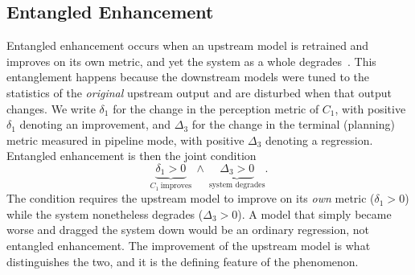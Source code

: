 \documentclass[conference]{IEEEtran}
\begin{document}
\subsection{Entangled Enhancement}
\label{sec:ee-def}
Entangled enhancement occurs when an upstream model is retrained and improves on
its own metric, and yet the system as a whole degrades~\cite{wang2024compsac}.
This entanglement happens because the downstream models were tuned to the
statistics of the \emph{original} upstream output and are disturbed when that
output changes. We write $\delta_1$ for the change in the perception metric of
$C_1$, with positive $\delta_1$ denoting an improvement, and $\Delta_3$ for the
change in the terminal (planning) metric measured in pipeline mode, with positive
$\Delta_3$ denoting a regression. Entangled enhancement is then the joint
condition
\begin{equation}
\underbrace{\delta_1 > 0}_{C_1\ \text{improves}}
\ \wedge\
\underbrace{\Delta_3 > 0}_{\text{system degrades}} .
\label{eq:ee}
\end{equation}
The condition requires the upstream model to improve on its \emph{own} metric
($\delta_1 > 0$) while the system nonetheless degrades ($\Delta_3 > 0$). A model
that simply became worse and dragged the system down would be an ordinary
regression, not entangled enhancement. The improvement of the upstream model is
what distinguishes the two, and it is the defining feature of the phenomenon.
\end{document}
